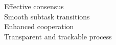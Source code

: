 \documentclass[preview]{standalone}
\begin{document}
Effective consensus\\Smooth subtask transitions\\Enhanced cooperation\\Transparent and trackable process\\
\end{document}
